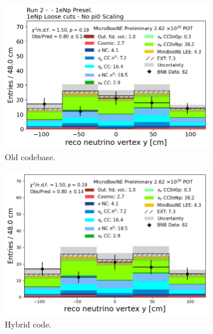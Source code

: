 \begin{figure}[H]
    \centering
    \begin{subfigure}[t]{0.32\linewidth}
        \includegraphics[width=\linewidth]{technote/Appendix_Validation/Figures/1eNp_Loose/Run2_Vertex_Y_Old.png}
        \caption{Old codebase.}
    \end{subfigure}%
    \hspace{0.2cm}%
    \begin{subfigure}[t]{0.32\linewidth}
        \includegraphics[width=\linewidth]{technote/Appendix_Validation/Figures/1eNp_Loose/Run2_Vertex_Y_Chris.png}
        \caption{Hybrid code.}
    \end{subfigure}%
    \hspace{0.2cm}%
    \begin{subfigure}[t]{0.32\linewidth}

\end{subfigure}
\end{figure}
